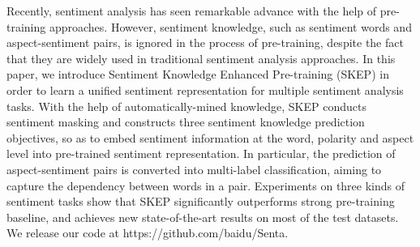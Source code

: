 Recently, sentiment analysis has seen remarkable advance with the help of pre-training approaches. However, sentiment knowledge, such as sentiment words and aspect-sentiment pairs, is ignored in the process of pre-training, despite the fact that they are widely used in traditional sentiment analysis approaches. In this paper, we introduce Sentiment Knowledge Enhanced Pre-training (SKEP) in order to learn a unified sentiment representation for multiple sentiment analysis tasks. With the help of automatically-mined knowledge, SKEP conducts sentiment masking and constructs three sentiment knowledge prediction objectives, so as to embed sentiment information at the word, polarity and aspect level into pre-trained sentiment representation. In particular, the prediction of aspect-sentiment pairs is converted into multi-label classification, aiming to capture the dependency between words in a pair. Experiments on three kinds of sentiment tasks show that SKEP significantly outperforms strong pre-training baseline, and achieves new state-of-the-art results on most of the test datasets. We release our code at https://github.com/baidu/Senta.
